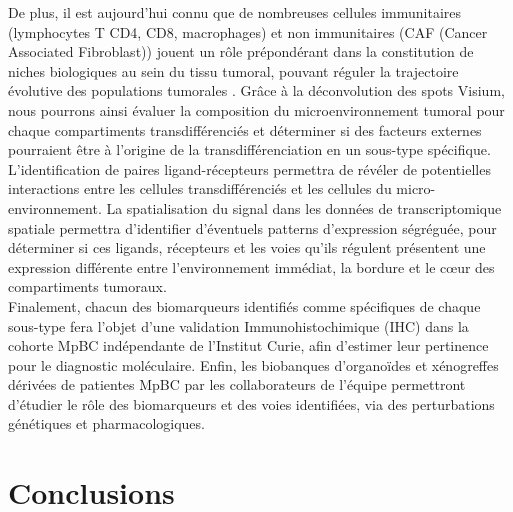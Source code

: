 \documentclass[11pt]{article}
\begin{document}
De plus, il est aujourd’hui connu que de nombreuses cellules immunitaires (lymphocytes T CD4, CD8, macrophages) et non immunitaires (CAF (Cancer Associated Fibroblast)) jouent un rôle prépondérant dans la constitution de niches biologiques au sein du tissu tumoral, pouvant réguler la trajectoire évolutive des populations tumorales \cite{fondationarc2020caf}. Grâce à la déconvolution des spots Visium, nous pourrons ainsi évaluer la composition du microenvironnement tumoral pour chaque compartiments transdifférenciés et déterminer si des facteurs externes pourraient être à l’origine de la transdifférenciation en un sous-type spécifique. L’identification de paires ligand-récepteurs permettra de révéler de potentielles interactions entre les cellules transdifférenciés et les cellules du micro-environnement. La spatialisation du signal dans les données de transcriptomique spatiale permettra d’identifier d’éventuels patterns d’expression ségréguée, pour déterminer si ces ligands, récepteurs et les voies qu’ils régulent présentent une expression différente entre l’environnement immédiat, la bordure et le cœur des compartiments tumoraux.\\

Finalement, chacun des biomarqueurs identifiés comme spécifiques de chaque sous-type fera l’objet d’une validation Immunohistochimique (IHC) dans la cohorte MpBC indépendante de l’Institut Curie, afin d’estimer leur pertinence pour le diagnostic moléculaire. Enfin, les biobanques d’organoïdes et xénogreffes dérivées de patientes MpBC par les collaborateurs de l’équipe permettront d’étudier le rôle des biomarqueurs et des voies identifiées, via des perturbations génétiques et pharmacologiques. 





\newpage


\section{Conclusions}
\end{document}
